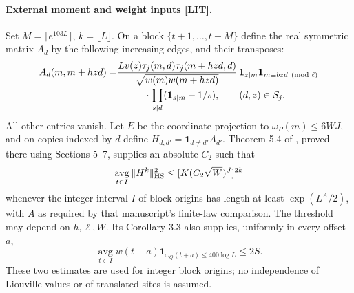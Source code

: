 \documentclass[11pt,a4paper]{article}
\numberwithin{equation}{section}
\theoremstyle{remark}\newtheorem{remark}[theorem]{Remark}
\newcommand{\1}{\mathbf 1}
\begin{document}
\paragraph{External moment and weight inputs {\rm[LIT]}.}
Set $M=\lceil e^{103L}\rceil$, $k=\lfloor L\rfloor$. On a block
$\{t+1,\ldots,t+M\}$ define the real symmetric matrix $A_d$ by the
following increasing edges, and their transposes:
\begin{equation}\label{eq:matrix}
 \begin{split}
 A_d(m,m+hzd)=
 &\frac{L v(z)\tau_j(m,d)\tau_j(m+hzd,d)}
          {\sqrt{w(m)w(m+hzd)}}\,
 \1_{z\mid m}\1_{m\equiv bzd\pmod\ell}\\[-2pt]
 &\hspace{10mm}\cdot\prod_{s\mid d}(\1_{s\mid m}-1/s),
 \qquad (d,z)\in\mathcal S_j.
 \end{split}
\end{equation}
All other entries vanish. Let $E$ be the coordinate projection to
$\omega_P(m)\le6WJ$, and on copies indexed by $d$ define
$H_{d,d'}=\1_{d\ne d'}A_{d'}$.
Theorem 5.4 of \cite{final}, proved there using Sections 5--7, supplies
an absolute $C_2$ such that
\begin{equation}\label{eq:moment}
 \operatorname*{avg}_{t\in I}\|H^k\|_{\rm HS}^2
 \le [K(C_2\sqrt W)^J]^{2k}
\end{equation}
whenever the integer interval $I$ of block origins has length at least
$\exp(L^A/2)$, with $A$ as required by that manuscript's finite-law
comparison. The threshold may depend on $h,\ell,W$.
Its Corollary 3.3 also supplies, uniformly in every offset $a$,
\begin{equation}\label{eq:weight}
 \operatorname*{avg}_{t\in I}
  w(t+a)\1_{\omega_Q(t+a)\le400\log L}\le2S.
\end{equation}
These two estimates are used for integer block origins; no independence
of Liouville values or of translated sites is assumed.
\end{document}
